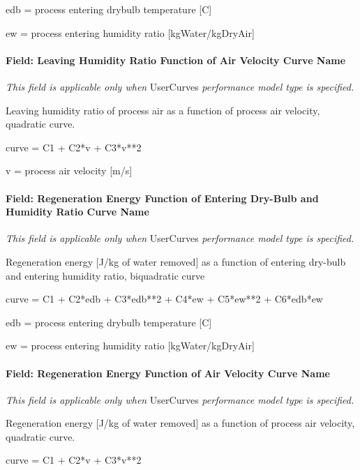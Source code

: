 edb = process entering drybulb temperature {[}C{]}

ew = process entering humidity ratio {[}kgWater/kgDryAir{]}

\paragraph{Field: Leaving Humidity Ratio Function of Air Velocity Curve Name}\label{field-leaving-humidity-ratio-function-of-air-velocity-curve-name}

\emph{This field is applicable only when} UserCurves \emph{performance model type is specified.}

Leaving humidity ratio of process air as a function of process air velocity, quadratic curve.

curve = C1 + C2*v + C3*v**2

v = process air velocity {[}m/s{]}

\paragraph{Field: Regeneration Energy Function of Entering Dry-Bulb and Humidity Ratio Curve Name}\label{field-regeneration-energy-function-of-entering-dry-bulb-and-humidity-ratio-curve-name}

\emph{This field is applicable only when} UserCurves \emph{performance model type is specified.}

Regeneration energy {[}J/kg of water removed{]} as a function of entering dry-bulb and entering humidity ratio, biquadratic curve

curve = C1 + C2*edb + C3*edb**2 + C4*ew + C5*ew**2 + C6*edb*ew

edb = process entering drybulb temperature {[}C{]}

ew = process entering humidity ratio {[}kgWater/kgDryAir{]}

\paragraph{Field: Regeneration Energy Function of Air Velocity Curve Name}\label{field-regeneration-energy-function-of-air-velocity-curve-name}

\emph{This field is applicable only when} UserCurves \emph{performance model type is specified.}

Regeneration energy {[}J/kg of water removed{]} as a function of process air velocity, quadratic curve.

curve = C1 + C2*v + C3*v**2

